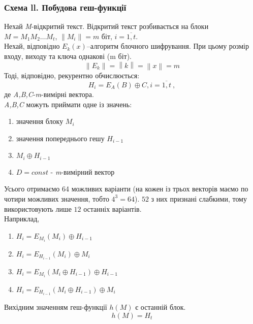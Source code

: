 \subsubsection*{Схема ll. Побудова геш-функції}
Нехай \textit{M}-відкритий текст. Відкритий текст розбивається на блоки \textit{$M=M_1M_2\ldots M_t$}, \textit{$\left\|M_i\right\|=m$} біт, \textit{$i=\overline{1,t}$}.\\
Нехай, відповідно \textit{$E_k(x)$}--алгоритм блочного шифрування. При цьому розмір входу, виходу та ключа однакові (m біт).
\textit{$$\left\|E_k \right\| = \left\| k \right\| = \left\| x \right\| = m $$}
Тоді, відповідно, рекурентно обчислюється:
$$H_i=E_A(B) \oplus C, \textit{$i=\overline{1,t}\: ,$}$$
де \textit{A,B,C}-\textit{m}-вимірні вектора.\\
\textit{A,B,C} можуть приймати одне із значень:
\begin{enumerate}
        \item значення блоку \textit{$M_i$}
        \item значення попереднього гешу \textit{$H_{i-1}$}
        \item $M_i \oplus H_{i-1}$
        \item $D=const$ - \textit{m}-вимірний вектор
\end{enumerate}
Усього отримаємо 64 можливих варіанти (на кожен із трьох векторів маємо по чотири можливих значення, тобто $4^3=64$). $52$ з них признані слабкими, тому використовують лише $12$ останніх варіантів.\\
Наприклад,
\begin{enumerate}
        \item $H_i=E_{M_i}(M_i) \oplus H_{i-1}$
        \item $H_i=E_{H_{i-1}}(M_i) \oplus M_i$
        \item $H_i=E_{M_i}(M_i \oplus H_{i-1}) \oplus H_{i-1}$
        \item $H_i=E_{H_{i-1}}(M_i \oplus H_{i-1}) \oplus M_i$
\end{enumerate}
Вихідним значенням геш-функції \textit{$h(M)$} є останній блок.$$h(M)=H_t$$
